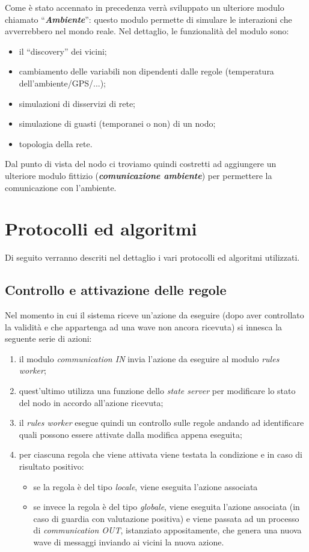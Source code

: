 \documentclass[italian]{memoir}
\begin{document}
Come è stato accennato in precedenza verrà sviluppato un ulteriore modulo chiamato
``\textbf{\textit{Ambiente}}'': questo modulo permette di simulare le interazioni
	   che avverrebbero nel mondo reale. Nel dettaglio, le funzionalità del modulo
	   sono:
\begin{itemize}
	\item il ``discovery'' dei vicini;
	\item cambiamento delle variabili non dipendenti dalle regole (temperatura dell'ambiente/GPS/...);
	\item simulazioni di disservizi di rete;
	\item simulazione di guasti (temporanei o non) di un nodo;
	\item topologia della rete.
\end{itemize}
Dal punto di vista del nodo ci troviamo quindi costretti ad aggiungere un ulteriore
	   modulo fittizio (\textbf{\textit{comunicazione ambiente}}) per permettere la
	   comunicazione
	   con l'ambiente.

\section{Protocolli ed algoritmi}

Di seguito verranno descriti nel dettaglio i vari protocolli ed algoritmi utilizzati.

\subsection{Controllo e attivazione delle regole}

Nel momento in cui il sistema riceve un'azione da eseguire (dopo aver controllato la validità e che appartenga ad una wave non ancora ricevuta) si innesca la seguente serie di azioni:
\begin{enumerate}
\item il modulo \textit{communication IN} invia l'azione da eseguire al modulo \textit{rules worker};
\item quest'ultimo utilizza una funzione dello \textit{state server} per modificare lo stato del nodo in accordo all'azione ricevuta;
\item il \textit{rules worker} esegue quindi un controllo sulle regole andando ad identificare quali possono essere attivate dalla modifica appena eseguita;
\item per ciascuna regola che viene attivata viene testata la condizione e in caso di risultato positivo:
\begin{itemize}
\item se la regola è del tipo \textit{locale}, viene eseguita l'azione associata
\item se invece la regola è del tipo \textit{globale}, viene eseguita l'azione associata (in caso di guardia con valutazione positiva) e viene passata ad un processo di \textit{communication OUT}, istanziato appositamente, che genera una nuova wave di messaggi inviando ai vicini la nuova azione.
\end{itemize}
\end{enumerate}
\end{document}
